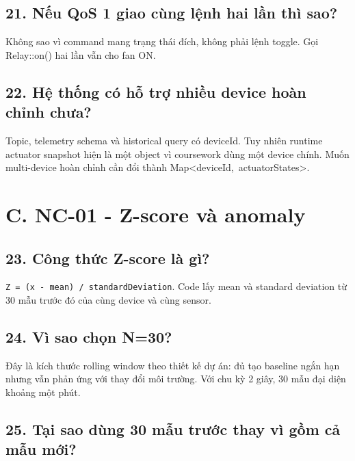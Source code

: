 \documentclass[11pt,oneside,openany]{book}
\renewcommand{\texttt}[1]{{\ttfamily\small #1}}
\begin{document}
\subsection{21. Nếu QoS 1 giao cùng lệnh hai lần thì
sao?}\label{21-nux1ebfu-qos-1-giao-cuxf9ng-lux1ec7nh-hai-lux1ea7n-thuxec-sao}

Không sao vì command mang trạng thái đích, không phải lệnh toggle. Gọi
\texttt{Relay::on()} hai lần vẫn cho fan ON.

\subsection{22. Hệ thống có hỗ trợ nhiều device hoàn chỉnh
chưa?}\label{22-hux1ec7-thux1ed1ng-cuxf3-hux1ed7-trux1ee3-nhiux1ec1u-device-houxe0n-chux1ec9nh-chux1b0a}

Topic, telemetry schema và historical query có deviceId. Tuy nhiên
runtime actuator snapshot hiện là một object vì coursework dùng một
device chính. Muốn multi-device hoàn chỉnh cần đổi thành
\texttt{Map\textless{}deviceId,\ actuatorStates\textgreater{}}.

\section{C. NC-01 - Z-score và
anomaly}\label{c-nc-01---z-score-vuxe0-anomaly}

\subsection{23. Công thức Z-score là
gì?}\label{23-cuxf4ng-thux1ee9c-z-score-luxe0-guxec}

\nolinkurl{Z = (x - mean) / standardDeviation}. Code lấy mean và
standard deviation từ 30 mẫu trước đó của cùng device và cùng sensor.

\subsection{24. Vì sao chọn N=30?}\label{24-vuxec-sao-chux1ecdn-n30}

Đây là kích thước rolling window theo thiết kế dự án: đủ tạo baseline
ngắn hạn nhưng vẫn phản ứng với thay đổi môi trường. Với chu kỳ 2 giây,
30 mẫu đại diện khoảng một phút.

\subsection{25. Tại sao dùng 30 mẫu trước thay vì gồm cả mẫu
mới?}\label{25-tux1ea1i-sao-duxf9ng-30-mux1eabu-trux1b0ux1edbc-thay-vuxec-gux1ed3m-cux1ea3-mux1eabu-mux1edbi}
\end{document}
